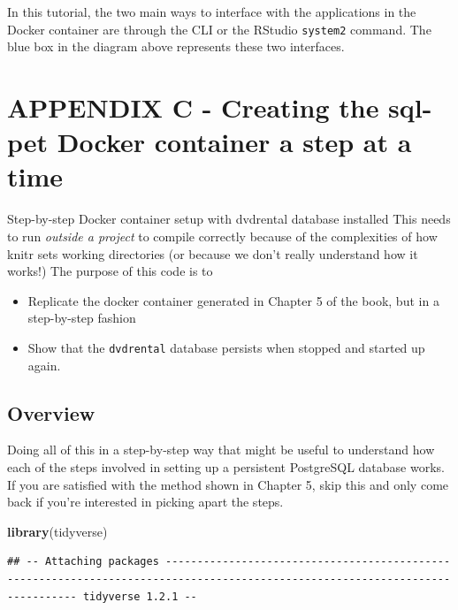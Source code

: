 \documentclass[]{book}
\newenvironment{Shaded}{\begin{snugshade}}{\end{snugshade}}
\newcommand{\KeywordTok}[1]{\textcolor[rgb]{0.13,0.29,0.53}{\textbf{#1}}}
\newcommand{\NormalTok}[1]{#1}
\providecommand{\tightlist}{%
  \setlength{\itemsep}{0pt}\setlength{\parskip}{0pt}}
\theoremstyle{definition}
\theoremstyle{definition}
\theoremstyle{definition}
\theoremstyle{remark}
\begin{document}
In this tutorial, the two main ways to interface with the applications
in the Docker container are through the CLI or the RStudio
\texttt{system2} command. The blue box in the diagram above represents
these two interfaces.

\hypertarget{appendix-c---creating-the-sql-pet-docker-container-a-step-at-a-time}{%
\chapter{APPENDIX C - Creating the sql-pet Docker container a step at a
time}\label{appendix-c---creating-the-sql-pet-docker-container-a-step-at-a-time}}

Step-by-step Docker container setup with dvdrental database installed
This needs to run \emph{outside a project} to compile correctly because
of the complexities of how knitr sets working directories (or because we
don't really understand how it works!) The purpose of this code is to

\begin{itemize}
\tightlist
\item
  Replicate the docker container generated in Chapter 5 of the book, but
  in a step-by-step fashion
\item
  Show that the \texttt{dvdrental} database persists when stopped and
  started up again.
\end{itemize}

\hypertarget{overview-1}{%
\section{Overview}\label{overview-1}}

Doing all of this in a step-by-step way that might be useful to
understand how each of the steps involved in setting up a persistent
PostgreSQL database works. If you are satisfied with the method shown in
Chapter 5, skip this and only come back if you're interested in picking
apart the steps.

\begin{Shaded}
\begin{Highlighting}[]
\KeywordTok{library}\NormalTok{(tidyverse)}
\end{Highlighting}
\end{Shaded}

\begin{verbatim}
## -- Attaching packages ------------------------------------------------------------------------------------------------------------------------------ tidyverse 1.2.1 --
\end{verbatim}
\end{document}
